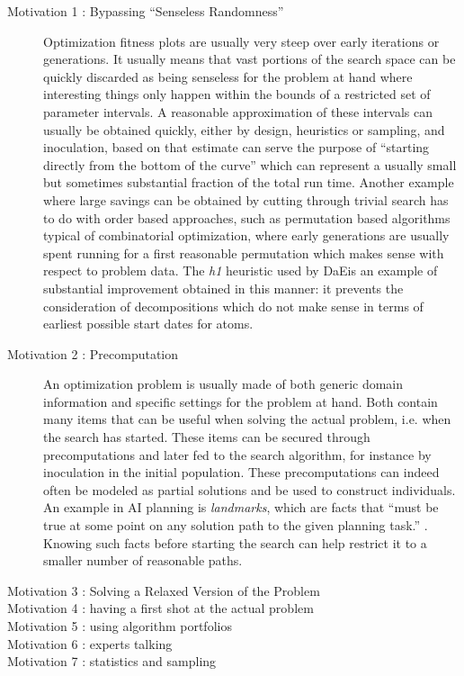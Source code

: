 \documentclass[english]{DESCARWINreport}
\newcommand{\DAE}{{\sc DaE}}
\begin{document}
\begin{description}

\item[Motivation 1 : Bypassing "`Senseless Randomness"'] 

Optimization fitness plots are usually very steep over early iterations or generations. It usually means that vast portions of the search space can be quickly discarded as being senseless for the problem at hand where interesting things only happen within the bounds of a restricted set of parameter intervals. A reasonable approximation of these intervals can usually be obtained quickly, either by design, heuristics or sampling, and inoculation, based on that estimate can serve the purpose of "`starting directly from the bottom of the curve"' which can represent a usually small but sometimes substantial fraction of the total run time. Another example where large savings can be obtained by cutting through trivial search has to do with order based approaches, such as permutation based algorithms typical of combinatorial optimization, where early generations are usually spent running for a first reasonable permutation which makes sense with respect to problem data. The \emph{h1} heuristic used by \DAE is an example of substantial improvement obtained in this manner: it prevents the consideration of decompositions which do not make sense in terms of earliest possible start dates for atoms.

\item[Motivation 2 : Precomputation]

An optimization problem is usually made of both generic domain information and specific settings for the problem at hand. Both contain many items that can be useful when solving the actual problem, i.e. when the search has started. These items can be secured through precomputations and later fed to the search algorithm, for instance by inoculation in the initial population. These precomputations can indeed often be modeled as partial solutions and be used to construct individuals. An example in AI planning is \emph{landmarks}, which are facts that "`must be true at some point on any solution path to the given planning task."' \cite{DBLP:journals/corr/abs-1107-0052}. Knowing such facts before starting the search can help restrict it to a smaller number of reasonable paths.

\item[Motivation 3 : Solving a Relaxed Version of the Problem]



\item[Motivation 4 : having a first shot at the actual problem]

\item[Motivation 5 : using algorithm portfolios]

\item[Motivation 6 : experts talking]

\item[Motivation 7 : statistics and sampling]

\end{description}
\end{document}
